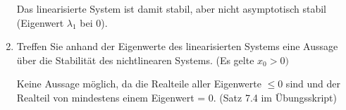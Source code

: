 \documentclass[crop=false]{standalone}
\begin{document}
\begin{task}
\begin{enumerate}[i]
\begin{solution}
    Das linearisierte System ist damit stabil, aber nicht asymptotisch stabil (Eigenwert $\lambda_1$ bei 0).
    \end{solution}
    \item Treffen Sie anhand der Eigenwerte des linearisierten Systems eine Aussage über
die Stabilität des nichtlinearen Systems. (Es gelte $x_{0}>0 )$
\begin{solution}
    Keine Aussage möglich, da die Realteile aller Eigenwerte $\leq 0$ sind und der Realteil von mindestens einem Eigenwert = 0. (Satz 7.4 im Übungsskript)
    \end{solution}
\end{enumerate}
\end{task}
\end{document}
